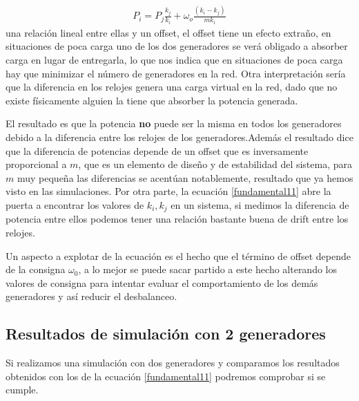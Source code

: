 \documentclass{tufte-handout}
\begin{document}
\begin{align}
    P_i=P_j\frac{k_j}{k_i}+\omega_o\frac{(k_i-k_j)}{mk_i}\label{fundamental11}
\end{align}
 una relación lineal entre ellas y un offset, el offset tiene un efecto extraño, en situaciones de poca carga uno de los dos generadores se verá obligado a absorber carga en lugar de entregarla, lo que nos indica que en situaciones de poca carga hay que minimizar el número de generadores en la red. Otra interpretación sería que la diferencia en los relojes genera una carga virtual en la red, dado que no existe físicamente alguien la tiene que absorber la potencia generada.

 El resultado es que la potencia \textbf{no} puede ser la misma en todos los generadores debido a la diferencia entre los relojes de los generadores.Además el resultado dice que la diferencia de potencias depende de un offset que es inversamente proporcional a $m$, que es un elemento de diseño y de estabilidad del sistema, para $m$ muy pequeña las diferencias se acentúan notablemente, resultado que ya hemos visto en las simulaciones. Por otra parte, la ecuación \ref{fundamental11} abre la puerta a encontrar los valores de $k_i, k_j$ en un sistema, si medimos la diferencia de potencia entre ellos podemos tener una relación bastante buena de drift entre los relojes.

 Un aspecto a explotar de la ecuación es el hecho que el término de offset depende de la consigna $\omega_0$, a lo mejor se puede sacar partido a este hecho alterando los valores de consigna para intentar evaluar el comportamiento de los demás generadores y así reducir el desbalanceo. 
 


 \subsection{Resultados de simulación con 2 generadores}
 Si realizamos una simulación con dos generadores y comparamos los resultados obtenidos con los de la ecuación \ref{fundamental11} podremos comprobar si se cumple.
\end{document}
